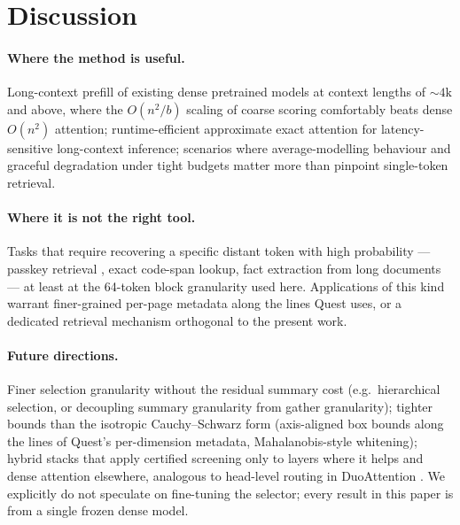 \documentclass[11pt]{article}
\theoremstyle{plain}
\theoremstyle{definition}
\begin{document}
\section{Discussion}

\paragraph{Where the method is useful.}
Long-context prefill of existing dense pretrained models at context
lengths of $\sim 4\mathrm{k}$ and above, where the $O(n^2/b)$ scaling of
coarse scoring comfortably beats dense $O(n^2)$ attention;
runtime-efficient approximate exact attention for latency-sensitive
long-context inference; scenarios where average-modelling behaviour and
graceful degradation under tight budgets matter more than pinpoint
single-token retrieval.

\paragraph{Where it is not the right tool.}
Tasks that require recovering a specific distant token with high
probability --- passkey retrieval \citep{liu2023lost}, exact code-span
lookup, fact extraction from long documents --- at least at the 64-token
block granularity used here. Applications of this kind warrant
finer-grained per-page metadata along the lines Quest
\citep{tang2024quest} uses, or a dedicated retrieval mechanism
orthogonal to the present work.

\paragraph{Future directions.}
Finer selection granularity without the residual summary cost (e.g.\
hierarchical selection, or decoupling summary granularity from gather
granularity); tighter bounds than the isotropic Cauchy--Schwarz form
(axis-aligned box bounds along the lines of Quest's per-dimension
metadata, Mahalanobis-style whitening); hybrid stacks that apply
certified screening only to layers where it helps and dense attention
elsewhere, analogous to head-level routing in DuoAttention
\citep{xiao2024duoattention}. We explicitly do not speculate on
fine-tuning the selector; every result in this paper is from a single
frozen dense model.

\end{document}
